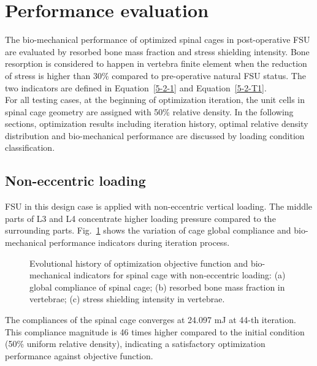 \documentclass[12pt]{extbook}
\begin{document}
\section{Performance evaluation}

The bio-mechanical performance of optimized spinal cages in post-operative FSU are evaluated by resorbed bone mass fraction and stress shielding intensity. Bone resorption is considered to happen in vertebra finite element when the reduction of stress is higher than 30\% compared to pre-operative natural FSU status. The two indicators are defined in Equation~\ref{5-2-1} and Equation~\ref{5-2-T1}.\\

For all testing cases, at the beginning of optimization iteration, the unit cells in spinal cage geometry are assigned with 50\% relative density. In the following sections, optimization results including iteration history, optimal relative density distribution and bio-mechanical performance are discussed by loading condition classification.\\


\subsection{Non-eccentric loading}

FSU in this design case is applied with non-eccentric vertical loading. The middle parts of L3 and L4 concentrate higher loading pressure compared to the surrounding parts. Fig.~\ref{history_noneccentric} shows the variation of cage global compliance and bio-mechanical performance indicators during iteration process.\\

\begin{figure}[htbp]
\centering
{}
\caption{Evolutional history of optimization objective function and bio-mechanical indicators for spinal cage with non-eccentric loading: (a) global compliance of spinal cage; (b) resorbed bone mass fraction in vertebrae; (c) stress shielding intensity in vertebrae.}
\label{history_noneccentric}
\end{figure}

The compliances of the spinal cage converges at 24.097 mJ at 44-th iteration. This compliance magnitude is 46 times higher compared to the initial condition (50\% uniform relative density), indicating a satisfactory optimization performance against objective function.\\
\end{document}
